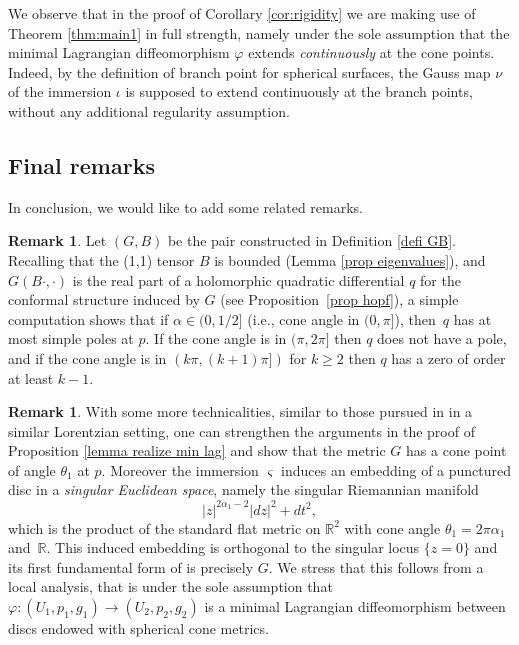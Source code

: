 \documentclass[11pt]{article}
\newcommand{\ie}{i.e.,\xspace}
\theoremstyle{definition}
\newtheorem{remark}[cor]{Remark}
\newcommand{\R}{{\mathbb R}}
\begin{document}
We observe that in the proof of Corollary \ref{cor:rigidity} we are making use of Theorem \ref{thm:main1} in full strength, namely under the sole assumption that the minimal Lagrangian diffeomorphism $\varphi$ extends \emph{continuously} at the cone points. Indeed, by the definition of branch point for spherical surfaces, the Gauss map $\nu$ of the immersion $\iota$ is supposed to extend {continuously} at the branch points, without any additional regularity assumption.

\subsection{Final remarks}
In conclusion, we would like to add some related remarks.

\begin{remark}
Let $(G,B)$ be the pair constructed in Definition \ref{defi GB}. Recalling that the (1,1) tensor $B$ is bounded (Lemma \ref{prop eigenvalues}), and $G(B\cdot,\cdot)$ is the real part of a holomorphic quadratic differential $q$ for the conformal structure induced by $G$ (see Proposition~\ref{prop hopf}), a simple computation shows that if $\alpha\in (0,1/2]$ (\ie cone angle in $(0,\pi]$), then~$q$ has at most simple poles at $p$. If the cone angle is in $(\pi,2\pi]$ then $q$ does not have a pole, and if the cone angle is in $(k\pi,(k+1)\pi])$ for $k\geq 2$ then $q$ has a zero of order at least $k-1$.
\end{remark}

\begin{remark}\label{rmk same cone angles}
With some more technicalities, similar to those pursued in \hbox{\cite[\S 4]{zbMATH06561539}} in a similar Lorentzian setting, one can strengthen the arguments in the proof of Proposition \ref{lemma realize min lag} and show that the metric $G$ has a cone point of angle $\theta_1$ at $p$. Moreover the immersion $\varsigma$ induces an embedding of a punctured disc in a \emph{singular Euclidean space}, namely the singular Riemannian manifold
\[
|z|^{2\alpha_1-2}|dz|^2+dt^2,
\]
which is the product of the standard flat metric on $\R^2$ with cone angle $\theta_1=2\pi\alpha_1$ and~$\R$. This induced embedding is orthogonal to the singular locus $\{z=0\}$ and its first fundamental form of is precisely $G$.
We stress that this follows from a local analysis, that is under the sole assumption that $\varphi:(U_1,p_1,g_1)\to (U_2,p_2,g_2)$ is a minimal Lagrangian diffeomorphism between discs endowed with spherical cone metrics.
\end{remark}
\end{document}
